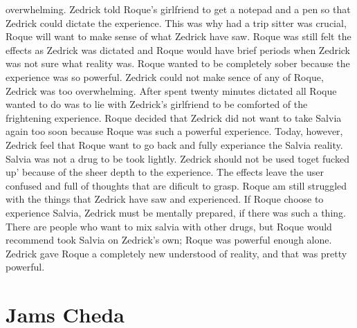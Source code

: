 \documentclass[12pt]{book}
\begin{document}
overwhelming. Zedrick told Roque's girlfriend to get a notepad and a pen so that Zedrick could dictate the experience. This was why had a trip sitter was crucial, Roque will want to make sense of what Zedrick have saw. Roque was still felt the effects as Zedrick was dictated and Roque would have brief periods when Zedrick was not sure what reality was. Roque wanted to be completely sober because the experience was so powerful. Zedrick could not make sence of any of Roque, Zedrick was too overwhelming. After spent twenty minutes dictated all Roque wanted to do was to lie with Zedrick's girlfriend to be comforted of the frightening experience. Roque decided that Zedrick did not want to take Salvia again too soon because Roque was such a powerful experience. Today, however, Zedrick feel that Roque want to go back and fully experiance the Salvia reality. Salvia was not a drug to be took lightly. Zedrick should not be used toget fucked up' because of the sheer depth to the experience. The effects leave the user confused and full of thoughts that are dificult to grasp. Roque am still struggled with the things that Zedrick have saw and experienced. If Roque choose to experience Salvia, Zedrick must be mentally prepared, if there was such a thing. There are people who want to mix salvia with other drugs, but Roque would recommend took Salvia on Zedrick's own; Roque was powerful enough alone. Zedrick gave Roque a completely new understood of reality, and that was pretty powerful.



\chapter{Jams Cheda}
\end{document}

